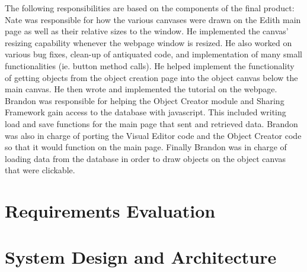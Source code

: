 \documentclass[12pt]{article}
\begin{document}
The following responsibilities are based on the components of the final product: \\

Nate was responsible for how the various canvases were drawn on the Edith main page as well as their relative sizes to the window. He implemented the canvas' resizing capability whenever the webpage window is resized. He also worked on various bug fixes, clean-up of antiquated code, and implementation of many small functionalities (ie. button method calls). He helped implement the functionality of getting objects from the object creation page into the object canvas below the main canvas. He then wrote and implemented the tutorial on the webpage. \\

Brandon was responsible for helping the Object Creator module and Sharing Framework gain access to the database with javascript.  This included writing load and save functions for the main page that sent and retrieved data.  Brandon was also in charge of porting the Visual Editor code and the Object Creator code so that it would function on the main page.  Finally Brandon was in charge of loading data from the database in order to draw objects on the object canvas that were clickable.  \\



\section{Requirements Evaluation}


\section{System Design and Architecture}


\end{document}
